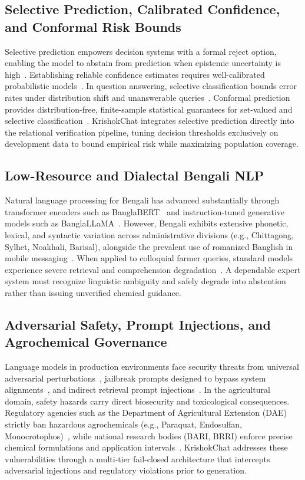 \documentclass[11pt,a4paper]{article}
\begin{document}
\subsection{Selective Prediction, Calibrated Confidence, and Conformal Risk Bounds}
Selective prediction empowers decision systems with a formal reject option, enabling the model to abstain from prediction when epistemic uncertainty is high~\cite{geifman2017selective, geifman2019selectivenet, kadavath2022language}. Establishing reliable confidence estimates requires well-calibrated probabilistic models~\cite{guo2017calibration}. In question answering, selective classification bounds error rates under distribution shift and unanswerable queries~\cite{kamath2020selective}. Conformal prediction provides distribution-free, finite-sample statistical guarantees for set-valued and selective classification~\cite{angelopoulos2023conformal, romano2020classification}. KrishokChat integrates selective prediction directly into the relational verification pipeline, tuning decision thresholds exclusively on development data to bound empirical risk while maximizing population coverage.

\subsection{Low-Resource and Dialectal Bengali NLP}
Natural language processing for Bengali has advanced substantially through transformer encoders such as BanglaBERT~\cite{hasan2020banglabert} and instruction-tuned generative models such as BanglaLLaMA~\cite{bhattacharjee2024banglallama}. However, Bengali exhibits extensive phonetic, lexical, and syntactic variation across administrative divisions (e.g., Chittagong, Sylhet, Noakhali, Barisal), alongside the prevalent use of romanized Banglish in mobile messaging~\cite{rahman2022dialect}. When applied to colloquial farmer queries, standard models experience severe retrieval and comprehension degradation~\cite{agritrust2026}. A dependable expert system must recognize linguistic ambiguity and safely degrade into abstention rather than issuing unverified chemical guidance.

\subsection{Adversarial Safety, Prompt Injections, and Agrochemical Governance}
Language models in production environments face security threats from universal adversarial perturbations~\cite{zou2023universal}, jailbreak prompts designed to bypass system alignments~\cite{wei2024jailbroken}, and indirect retrieval prompt injections~\cite{perez2022redteaming, zhang2024siren}. In the agricultural domain, safety hazards carry direct biosecurity and toxicological consequences. Regulatory agencies such as the Department of Agricultural Extension (DAE) strictly ban hazardous agrochemicals (e.g., Paraquat, Endosulfan, Monocrotophos)~\cite{dae2021}, while national research bodies (BARI, BRRI) enforce precise chemical formulations and application intervals~\cite{bari2020, brri2024, krishokchat2026}. KrishokChat addresses these vulnerabilities through a multi-tier fail-closed architecture that intercepts adversarial injections and regulatory violations prior to generation.
\end{document}

